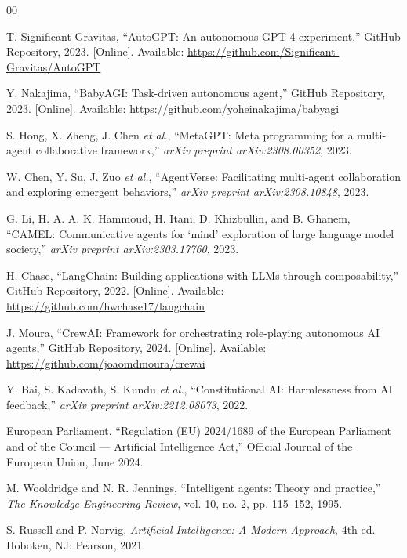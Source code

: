 \documentclass[conference]{IEEEtran}
\begin{document}
\begin{thebibliography}{00}

T. Significant Gravitas, ``AutoGPT: An autonomous GPT-4 experiment,'' GitHub Repository, 2023. [Online]. Available: \url{https://github.com/Significant-Gravitas/AutoGPT}

Y. Nakajima, ``BabyAGI: Task-driven autonomous agent,'' GitHub Repository, 2023. [Online]. Available: \url{https://github.com/yoheinakajima/babyagi}

S. Hong, X. Zheng, J. Chen \textit{et al.}, ``MetaGPT: Meta programming for a multi-agent collaborative framework,'' \textit{arXiv preprint arXiv:2308.00352}, 2023.

W. Chen, Y. Su, J. Zuo \textit{et al.}, ``AgentVerse: Facilitating multi-agent collaboration and exploring emergent behaviors,'' \textit{arXiv preprint arXiv:2308.10848}, 2023.

G. Li, H. A. A. K. Hammoud, H. Itani, D. Khizbullin, and B. Ghanem, ``CAMEL: Communicative agents for `mind' exploration of large language model society,'' \textit{arXiv preprint arXiv:2303.17760}, 2023.

H. Chase, ``LangChain: Building applications with LLMs through composability,'' GitHub Repository, 2022. [Online]. Available: \url{https://github.com/hwchase17/langchain}

J. Moura, ``CrewAI: Framework for orchestrating role-playing autonomous AI agents,'' GitHub Repository, 2024. [Online]. Available: \url{https://github.com/joaomdmoura/crewai}

Y. Bai, S. Kadavath, S. Kundu \textit{et al.}, ``Constitutional AI: Harmlessness from AI feedback,'' \textit{arXiv preprint arXiv:2212.08073}, 2022.

European Parliament, ``Regulation (EU) 2024/1689 of the European Parliament and of the Council — Artificial Intelligence Act,'' Official Journal of the European Union, June 2024.

M. Wooldridge and N. R. Jennings, ``Intelligent agents: Theory and practice,'' \textit{The Knowledge Engineering Review}, vol. 10, no. 2, pp. 115--152, 1995.

S. Russell and P. Norvig, \textit{Artificial Intelligence: A Modern Approach}, 4th ed. Hoboken, NJ: Pearson, 2021.

\end{thebibliography}
\end{document}
